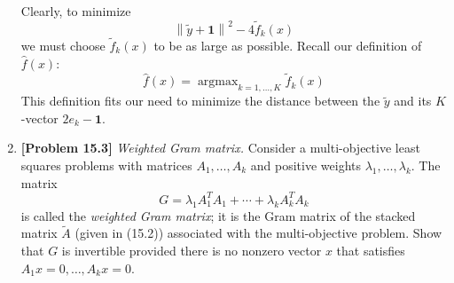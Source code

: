 \begin{enumerate}[label=(\alph*)]
\begin{tcolorbox}
		      Clearly, to minimize
		      $$\left\| \tilde{y} + \mathbf{1} \right\|^2 - 4\tilde{f}_k(x) $$
		      we must choose $\tilde{f}_k(x)$ to be as large as possible. Recall
		      our definition of $\hat{f}(x)$:
		      $$\hat{f}(x) = \operatorname{argmax}_{k = 1,\ldots,K}
			      \tilde{f}_k(x)$$
		      This definition fits our need to minimize the distance between the
		      $\tilde{y}$ and its $K$-vector $2e_k - \mathbf{1}$.
	      \end{tcolorbox}

	\item \textbf{[Problem 15.3]} \textit{Weighted Gram matrix.} Consider a
	      multi-objective least squares problems with matrices $A_1, \ldots,
		      A_k$ and positive weights $\lambda_1, \ldots, \lambda_k$. The matrix
	      $$ G = \lambda_1 A_1^T A_1 + \cdots + \lambda_k A_k^T A_k $$
	      is called the \textit{weighted Gram matrix}; it is the Gram matrix of
	      the stacked matrix $\tilde{A}$ (given in (15.2)) associated with the
	      multi-objective problem. Show that $G$ is invertible provided there is
	      no nonzero vector $x$ that satisfies $A_1 x = 0, \ldots, A_k x = 0$.


\end{enumerate}
